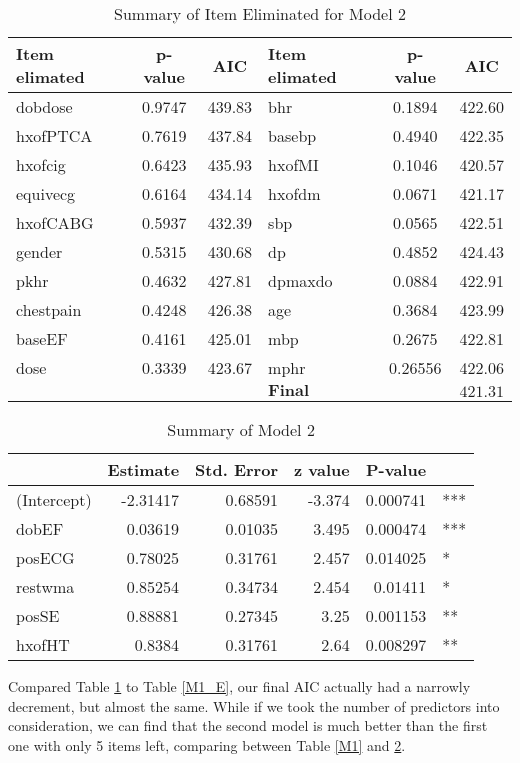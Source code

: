 \documentclass[a4paper,12pt]{article}
\begin{document}
 \begin{table}[tbp]
   \centering
   \caption{Summary of Item Eliminated for Model 2}
     \begin{tabular}{lcclcc}
     \toprule[1.5pt]
     Item elimated  & p-value & AIC   & Item elimated  & p-value & AIC \\
     \midrule
     dobdose & 0.9747 & 439.83 & bhr   & 0.1894 & 422.60 \\
     hxofPTCA & 0.7619 & 437.84 & basebp & 0.4940 & 422.35 \\
     hxofcig & 0.6423 & 435.93 & hxofMI  & 0.1046 & 420.57 \\
     equivecg & 0.6164 & 434.14 & hxofdm  & 0.0671 & 421.17 \\
     hxofCABG & 0.5937 & 432.39 & sbp   & 0.0565 & 422.51 \\
     gender & 0.5315 & 430.68 & dp    & 0.4852 & 424.43 \\
     pkhr  & 0.4632 & 427.81 & dpmaxdo & 0.0884 & 422.91 \\
     chestpain & 0.4248 & 426.38 & age   & 0.3684 & 423.99 \\
     baseEF & 0.4161 & 425.01 & mbp   & 0.2675 & 422.81 \\
     dose  & 0.3339 & 423.67 & mphr  & 0.26556 & 422.06 \\
     \midrule
           &     &     & $\mathbf{Final}$ &       & $\mathbf{421.31}$ \\
     \bottomrule[1.5pt]
     \end{tabular}
   \label{M2_E}
 \end{table}%

  \begin{table}[h]
    \centering
    \caption{Summary of Model 2}
      \begin{tabular}{lrrrrl}
      \toprule[1.5pt]
            & Estimate & Std. Error & z value & P-value &  \\
      \midrule
      (Intercept) & -2.31417 & 0.68591 & -3.374 & 0.000741 & *** \\
      dobEF & 0.03619 & 0.01035 & 3.495 & 0.000474 & *** \\
      posECG & 0.78025 & 0.31761 & 2.457 & 0.014025 & * \\
      restwma & 0.85254 & 0.34734 & 2.454 & 0.01411 & * \\
      posSE & 0.88881 & 0.27345 & 3.25  & 0.001153 & ** \\
      hxofHT & 0.8384 & 0.31761 & 2.64  & 0.008297 & ** \\
      \bottomrule[1.5pt]
      \end{tabular}
    \label{M2}
  \end{table}%
  Compared Table \ref{M2_E} to Table \ref{M1_E}, our final AIC actually had a narrowly decrement, but almost the same. While if we took the number of predictors into consideration, we can find that the second model is much better than the first one with only 5 items left, comparing between Table \ref{M1} and \ref{M2}. \\
\end{document}

